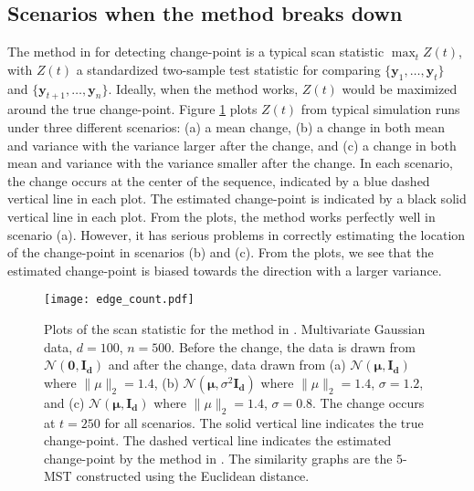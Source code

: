 \documentclass[arxiv, preprint]{imsart}
\numberwithin{equation}{section}
\theoremstyle{plain}
\begin{document}
\subsection{Scenarios when the method breaks down}
\label{sec:2.1}

The method in \cite{chen2015graph} for detecting change-point is a typical scan statistic $\max_{t} Z(t)$, with $Z(t)$ a standardized two-sample test statistic for comparing $\{\mathbf{y}_1, \hdots, \mathbf{y}_t \}$ and $\{\mathbf{y}_{t+1}, \hdots, \mathbf{y}_n \}$. Ideally, when the method works, $Z(t)$ would be maximized around the true change-point. Figure \ref{fig:edge_count} plots $Z(t)$ from typical simulation runs under three different scenarios: (a) a mean change, (b) a change in both mean and variance with the variance larger after the change, and (c) a change in both mean and variance with the variance  smaller after the change.  %
 In each scenario, the change occurs at the center of the sequence, indicated by a blue dashed vertical line in each plot.  The estimated change-point is indicated by a black solid vertical line in each plot.   From the plots, the method works perfectly well in scenario (a).  However, it has serious problems in correctly estimating the location of the change-point in scenarios (b) and (c).  From the plots, we see that the estimated change-point is biased towards the direction with a larger variance.


\begin{figure}[!htp]
\centering
	\texttt{[image: edge\_count.pdf]}
  \caption{Plots of the scan statistic for the method in \cite{chen2015graph}. Multivariate Gaussian data, $d=100$, $n=500$. Before the change, the data is drawn from $\mathcal{N}(\mathbf{0},\mathbf{I_d})$ and after the change, data drawn from (a) $\mathcal{N}(\mathbf{\mu},\mathbf{I_d})$ where $\|\mu\|_2 = 1.4$, (b) $\mathcal{N}(\mathbf{\mu},\sigma^2 \mathbf{I_d})$ where $\|\mu\|_2 = 1.4$, $\sigma = 1.2$, and (c) $\mathcal{N}(\mathbf{\mu},\mathbf{I_d})$ where $\|\mu\|_2 = 1.4$, $\sigma = 0.8$. The change occurs at $t=250$ for all scenarios. The solid vertical line indicates the true change-point. The dashed vertical line indicates the estimated change-point by the method in \cite{chen2015graph}. The similarity graphs are the $5$-MST constructed using the Euclidean distance. }
  \label{fig:edge_count}
\end{figure}
\end{document}
